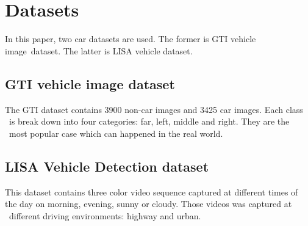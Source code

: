 \documentclass[conference]{IEEEtran}
\begin{document}
%



\section{Datasets}
In this paper, two car datasets are used. The former is GTI vehicle image\
 dataset. The latter is LISA vehicle dataset.

\subsection{GTI vehicle image dataset}
The GTI dataset contains 3900 non-car images and 3425  car images. Each class \
is break down into four categories: far, left, middle and right. They are the  \
most popular case which can happened in the real world.

\subsection{LISA Vehicle Detection dataset}
This dataset contains three color video sequence captured at different times of the day on morning, evening, sunny or cloudy. Those videos was captured at \
different driving environments: highway and urban.
\end{document}
